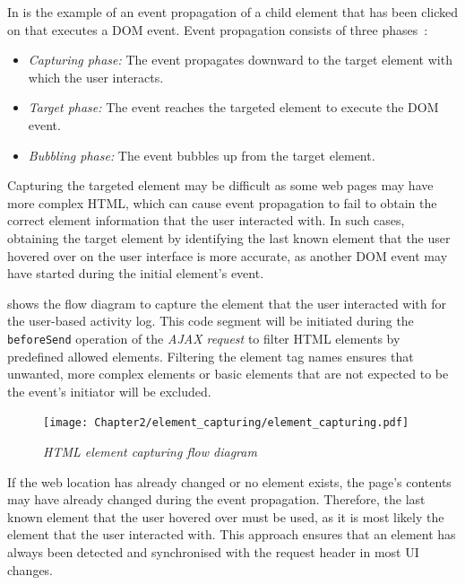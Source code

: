 In  is the example of an event propagation of a child element that has been clicked on that executes a DOM event. Event propagation consists of three phases~\cite{EventBubbling}:

\begin{itemize}
	\item \textit{Capturing phase:} The event propagates downward to the target element with which the user interacts.
	\item \textit{Target phase:} The event reaches the targeted element to execute the DOM event.
	\item \textit{Bubbling phase:} The event bubbles up from the target element.
\end{itemize}

Capturing the targeted element may be difficult as some web pages may have more complex HTML, which can cause event propagation to fail to obtain the correct element information that the user interacted with. In such cases, obtaining the target element by identifying the last known element that the user hovered over on the user interface is more accurate, as another DOM event may have started during the initial element's event.\par {} shows the flow diagram to capture the element that the user interacted with for the user-based activity log. This code segment will be initiated during the \texttt{beforeSend} operation of the \textit{AJAX request} to filter HTML elements by predefined allowed elements. Filtering the element tag names ensures that unwanted, more complex elements or basic elements that are not expected to be the event's initiator will be excluded. 

\begin{figure}[!htb]
	\centering %
	\texttt{[image: Chapter2/element\_capturing/element\_capturing.pdf]}
	\caption[HTML element capturing flow diagram]
	{\textit{HTML element capturing flow diagram}}\label{fig:ch3_element_event_capturing}
\end{figure}

If the web location has already changed or no element exists, the page's contents may have already changed during the event propagation. Therefore, the last known element that the user hovered over must be used, as it is most likely the element that the user interacted with. This approach ensures that an element has always been detected and synchronised with the request header in most UI changes.

